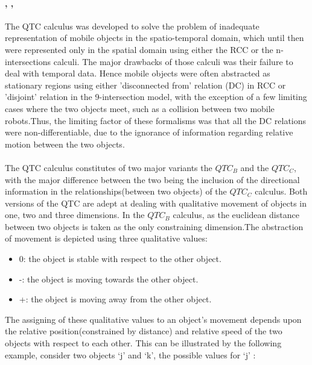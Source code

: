 	\paragraph{\cite{van2004representing}, \cite{van2006qualitative}, \cite{van2005qualitative}}The QTC calculus was developed to solve the problem of inadequate representation of mobile objects in the spatio-temporal domain, which until then were represented only in the spatial domain using either the RCC or the n-intersections calculi. The major drawbacks of those calculi was their failure to deal with temporal data. Hence mobile objects were often abstracted as stationary regions using either 'disconnected from' relation (DC) in RCC or 'disjoint' relation in the 9-intersection model, with the exception of a few limiting cases where the two objects meet, such as a collision between two mobile robots.Thus, the limiting factor of these formalisms was that all the DC relations were non-differentiable, due to the ignorance of information regarding relative motion between the two objects.
	\paragraph{}The QTC calculus constitutes of two major variants the $QTC_B$ and the $QTC_C$, with the major difference between the two being the inclusion of the directional information in the relationships(between two objects) of the $QTC_C$ calculus. Both versions of the QTC are adept at dealing with qualitative movement of objects in one, two and three dimensions. In the $QTC_B$ calculus, as the euclidean distance between two objects is taken as the only constraining dimension.The abstraction of movement is depicted using three qualitative values:
	\begin{itemize}
		\item 0: the object is stable with respect to the other object.
		\item -: the object is moving towards the other object.
		\item +: the object is moving away from the other object.
	\end{itemize}
	The assigning of these qualitative values to an object's movement depends upon the relative position(constrained by distance) and relative speed of the two objects with respect to each other. This can be illustrated by the following example, consider two objects `j' and `k', the possible values for `j' :
	

